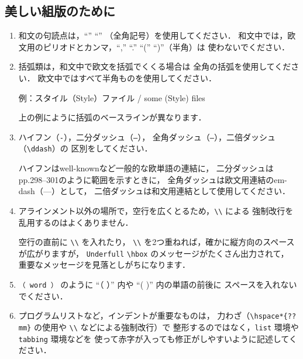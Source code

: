 \documentclass[technicalreport]{ieicej}
\begin{document}
\subsection{美しい組版のために}
\label{sec:hyouki}

\begin{enumerate}
\item
和文の句読点は，``'' ``''%
（全角記号）を使用してください．
和文中では，欧文用のピリオドとカンマ，``,'' ``.'' ``('' ``)''（半角）は
使わないでください．

\item
括弧類は，和文中で欧文を括弧でくくる場合は
全角の括弧を使用してください．
欧文中ではすべて半角ものを使用してください．

\noindent
例：スタイル（Style）ファイル / some (Style) files

上の例にように括弧のベースラインが異なります．

\item
ハイフン（\texttt{-}），二分ダッシュ（\texttt{--}），
全角ダッシュ（\texttt{---}），二倍ダッシュ（\verb/\ddash/）の
区別をしてください．

ハイフンはwell-knownなど一般的な欧単語の連結に，
二分ダッシュはpp.298--301のように範囲を示すときに，
全角ダッシュは欧文用連結のem-dash（---）として，
二倍ダッシュは和文用連結として使用してください．

\item
アラインメント以外の場所で，空行を広くとるため，\verb/\\/ による
強制改行を乱用するのはよくありません．

空行の直前に \verb/\\/ を入れたり，
\verb/\\/ を2つ重ねれば，確かに縦方向のスペースが広がりますが，
\texttt{Underfull} \verb/\hbox/ のメッセージがたくさん出力されて，
重要なメッセージを見落としがちになります\cite{jiyuu}．

\item
\verb*/（ word ）/ のように ``（ ）'' 内や ``( )'' 内の単語の前後に
スペースを入れないでください．

\item
プログラムリストなど，インデントが重要なものは，
力わざ（\verb/\hspace*{??mm}/ の使用や \verb/\\/ などによる強制改行）で
整形するのではなく，\texttt{list} 環境や \texttt{tabbing} 環境などを
使って赤字が入っても修正がしやすいように記述してください．
\end{enumerate}
\end{document}
